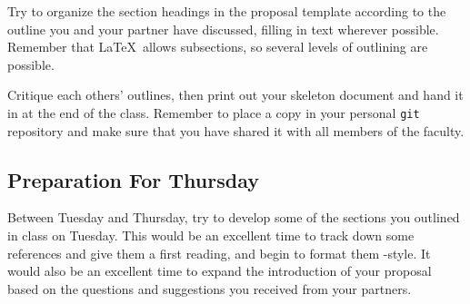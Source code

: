  Try to organize the section headings in the proposal template
according to the outline you and your partner have discussed, filling in text
wherever possible. Remember that \LaTeX\ allows subsections, so several
levels of outlining are possible.

 Critique each others' outlines, then print out your
skeleton document and hand it in at the end of the class. Remember to place a
copy in your personal {\tt git} repository and make sure that you have shared it
with all members of the faculty.

\subsection*{Preparation For Thursday}
Between Tuesday and Thursday, try to develop some of the sections you
outlined in class on Tuesday. This would be an excellent time to track down
some references and give them a first reading,
and begin to format them \BibTeX-style. It would also be an excellent time to
expand the introduction of your proposal based on the questions and
suggestions you received from your partners.


